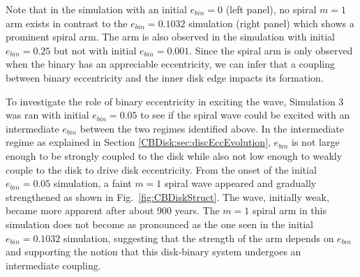 Note that in the simulation with an initial $e_{bin} = 0$ (left panel), no spiral $m = 1$ 
arm exists in contrast to the $e_{bin} = 0.1032$ simulation (right panel) which
shows a prominent spiral arm.  The arm is also observed in the
simulation with initial $e_{bin} = 0.25$ but not with initial $e_{bin}
= 0.001$.  Since the spiral arm is only observed when the binary has
an appreciable eccentricity, we can infer that a coupling between binary eccentricity
and the inner disk edge impacts its formation.  

To investigate the role of binary eccentricity in exciting the wave, Simulation 3 was ran with initial $e_{bin} = 0.05$ to see if the spiral wave could be excited with an intermediate $e_{bin}$ between the two regimes identified above.  In the intermediate regime as explained in Section \ref{CBDisk:sec:discEccEvolution}, $e_{bin}$ is not large enough to be strongly coupled to the disk while also not low enough to weakly couple to the disk to drive disk eccentricity.  From the onset of the initial $e_{bin} = 0.05$ simulation, a faint $m = 1$ spiral wave appeared and gradually strengthened as shown in Fig.~\ref{fig:CBDiskStruct}.  The wave, initially weak, became more apparent after about 900 years.  The $m = 1$ spiral arm in this simulation does not become as pronounced as the one seen in the initial $e_{bin} = 0.1032$ simulation, suggesting that the strength of the arm depends on $e_{bin}$ and supporting the notion that this disk-binary system undergoes an intermediate coupling.  

